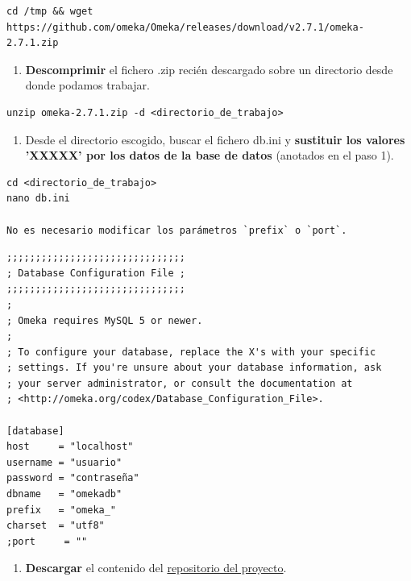 \documentclass[
]{article}
\providecommand{\tightlist}{%
  \setlength{\itemsep}{0pt}\setlength{\parskip}{0pt}}
\begin{document}
\begin{verbatim}
cd /tmp && wget https://github.com/omeka/Omeka/releases/download/v2.7.1/omeka-2.7.1.zip
\end{verbatim}

\begin{enumerate}
\def\labelenumi{\arabic{enumi}.}
\setcounter{enumi}{2}
\tightlist
\item
  \textbf{Descomprimir} el fichero {.zip} recién descargado sobre un
  directorio desde donde podamos trabajar.
\end{enumerate}

\begin{verbatim}
unzip omeka-2.7.1.zip -d <directorio_de_trabajo>
\end{verbatim}

\begin{enumerate}
\def\labelenumi{\arabic{enumi}.}
\setcounter{enumi}{3}
\tightlist
\item
  Desde el directorio escogido, buscar el fichero {db.ini} y
  \textbf{sustituir los valores 'XXXXX' por los datos de la base de
  datos} (anotados en el paso 1).
\end{enumerate}

\begin{verbatim}
cd <directorio_de_trabajo>
nano db.ini

No es necesario modificar los parámetros `prefix` o `port`.
\end{verbatim}

\begin{verbatim}
;;;;;;;;;;;;;;;;;;;;;;;;;;;;;;;
; Database Configuration File ;
;;;;;;;;;;;;;;;;;;;;;;;;;;;;;;;
;
; Omeka requires MySQL 5 or newer.
;
; To configure your database, replace the X's with your specific
; settings. If you're unsure about your database information, ask
; your server administrator, or consult the documentation at
; <http://omeka.org/codex/Database_Configuration_File>.

[database]
host     = "localhost"
username = "usuario"
password = "contraseña"
dbname   = "omekadb"
prefix   = "omeka_"
charset  = "utf8"
;port     = ""
\end{verbatim}

\begin{enumerate}
\def\labelenumi{\arabic{enumi}.}
\setcounter{enumi}{4}
\tightlist
\item
  \textbf{Descargar} el contenido del
  \href{https://github.com/gcm1001/TFG-CeniehAriadne}{repositorio del
  proyecto}.
\end{enumerate}
\end{document}
